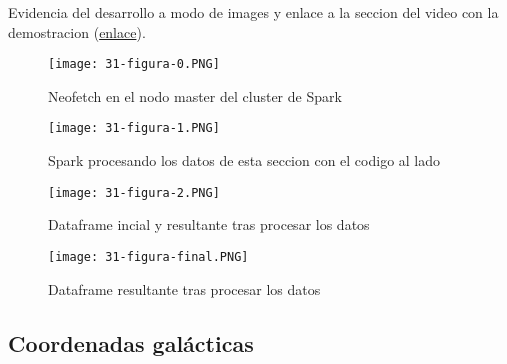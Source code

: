 \documentclass[12pt,letterpaper,twoside]{article}
\begin{document}
\newpage

Evidencia del desarrollo a modo de images y enlace a la seccion del video con la demostracion ({\color{blue}\href{https://youtu.be/GdrpnyFULTI?si=b5H6Qznky7ijbZmJ&t=177}{enlace}}).

\begin{figure}[H]
    \centering
    \texttt{[image: 31-figura-0.PNG]}
    \caption{Neofetch en el nodo master del cluster de Spark}
\end{figure}

\begin{figure}[H]
    \centering
    \texttt{[image: 31-figura-1.PNG]}
    \caption{Spark procesando los datos de esta seccion con el codigo al lado}
\end{figure}

\begin{figure}[H]
    \centering
    \texttt{[image: 31-figura-2.PNG]}
    \caption{Dataframe incial y resultante tras procesar los datos}
\end{figure}

\newpage

\begin{figure}[H]
    \centering
    \texttt{[image: 31-figura-final.PNG]}
    \caption{Dataframe resultante tras procesar los datos}
\end{figure}

\newpage

\begin{code}[H]
    
\end{code}

\newpage

\begin{code}[H]
    
\end{code}
\newpage
\begin{code}[H]
    
\end{code}

\newpage

\subsection{Coordenadas galácticas}
\end{document}
